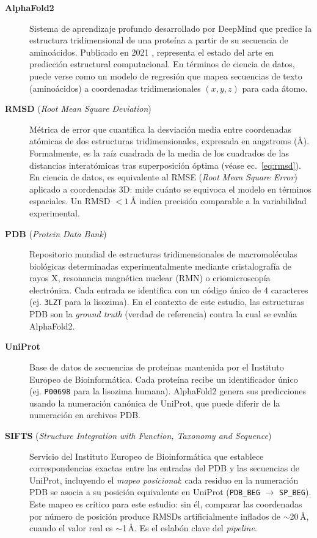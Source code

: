 \begin{description}

    \item[\textbf{AlphaFold2}]
    Sistema de aprendizaje profundo desarrollado por DeepMind que predice la estructura
    tridimensional de una prote\'ina a partir de su secuencia de amino\'acidos.
    Publicado en 2021 \citep{jumper2021highly}, representa el estado del arte en predicci\'on
    estructural computacional. En t\'erminos de ciencia de datos, puede verse como un
    modelo de regresi\'on que mapea secuencias de texto (amino\'acidos) a coordenadas
    tridimensionales $(x,y,z)$ para cada \'atomo.

    \item[\textbf{RMSD} (\textit{Root Mean Square Deviation})]
    M\'etrica de error que cuantifica la desviaci\'on media entre coordenadas at\'omicas
    de dos estructuras tridimensionales, expresada en angstroms (\AA).
    Formalmente, es la ra\'iz cuadrada de la media de los cuadrados de las distancias
    interatómicas tras superposici\'on \'optima (v\'ease ec.~\ref{eq:rmsd}).
    En ciencia de datos, es equivalente al RMSE (\textit{Root Mean Square Error}) aplicado
    a coordenadas 3D: mide cu\'anto se equivoca el modelo en t\'erminos espaciales.
    Un RMSD $<1$\,\AA{} indica precisi\'on comparable a la variabilidad experimental.

    \item[\textbf{PDB} (\textit{Protein Data Bank})]
    Repositorio mundial de estructuras tridimensionales de macromol\'eculas biol\'ogicas
    determinadas experimentalmente mediante cristalograf\'ia de rayos X, resonancia
    magn\'etica nuclear (RMN) o criomicroscop\'ia electr\'onica. Cada entrada se identifica
    con un c\'odigo \'unico de 4 caracteres (ej. \texttt{3LZT} para la lisozima).
    En el contexto de este estudio, las estructuras PDB son la \emph{ground truth}
    (verdad de referencia) contra la cual se eval\'ua AlphaFold2.

    \item[\textbf{UniProt}]
    Base de datos de secuencias de prote\'inas mantenida por el Instituto Europeo de
    Bioinform\'atica. Cada prote\'ina recibe un identificador \'unico (ej. \texttt{P00698}
    para la lisozima humana). AlphaFold2 genera sus predicciones usando la numeraci\'on
    can\'onica de UniProt, que puede diferir de la numeraci\'on en archivos PDB.

    \item[\textbf{SIFTS} (\textit{Structure Integration with Function, Taxonomy and Sequence})]
    Servicio del Instituto Europeo de Bioinform\'atica que establece correspondencias
    exactas entre las entradas del PDB y las secuencias de UniProt, incluyendo el
    \emph{mapeo posicional}: cada residuo en la numeraci\'on PDB se asocia a su posici\'on
    equivalente en UniProt (\texttt{PDB\_BEG} $\to$ \texttt{SP\_BEG}).
    Este mapeo es cr\'itico para este estudio: sin \'el, comparar las coordenadas por
    n\'umero de posici\'on produce RMSDs artificialmente inflados de $\sim$20\,\AA{},
    cuando el valor real es $\sim$1\,\AA{}. Es el eslab\'on clave del \textit{pipeline}.


\end{description}
